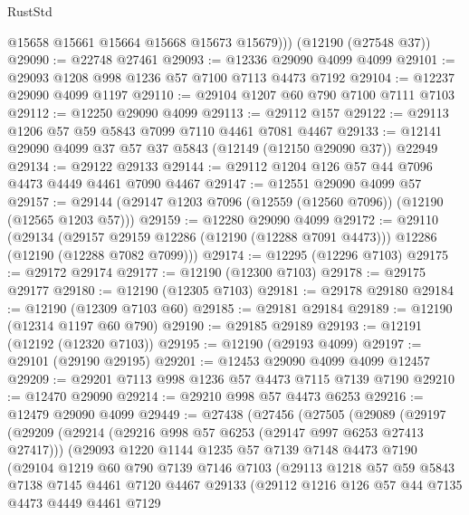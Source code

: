 \begin{lexlean}{RustStd}
\begin{coremodule}
          @15658
          @15661
          @15664
          @15668
          @15673
          @15679)))
    (@12190 (@27548 @37))
@29090 := @22748 @27461
@29093 := @12336 @29090 @4099 @4099
@29101 := @29093 @1208 @998 @1236 @57 @7100 @7113 @4473 @7192
@29104 := @12237 @29090 @4099 @1197
@29110 := @29104 @1207 @60 @790 @7100 @7111 @7103
@29112 := @12250 @29090 @4099
@29113 := @29112 @157
@29122 := @29113 @1206 @57 @59 @5843 @7099 @7110 @4461 @7081 @4467
@29133 := @12141 @29090 @4099 @37 @57 @37 @5843 (@12149 (@12150 @29090 @37)) @22949
@29134 := @29122 @29133
@29144 := @29112 @1204 @126 @57 @44 @7096 @4473 @4449 @4461 @7090 @4467
@29147 := @12551 @29090 @4099 @57
@29157 := @29144 (@29147 @1203 @7096 (@12559 (@12560 @7096)) (@12190 (@12565 @1203 @57)))
@29159 := @12280 @29090 @4099
@29172 := @29110
    (@29134
      (@29157 @29159 @12286 (@12190 (@12288 @7091 @4473)))
      @12286
      (@12190 (@12288 @7082 @7099)))
@29174 := @12295 (@12296 @7103)
@29175 := @29172 @29174
@29177 := @12190 (@12300 @7103)
@29178 := @29175 @29177
@29180 := @12190 (@12305 @7103)
@29181 := @29178 @29180
@29184 := @12190 (@12309 @7103 @60)
@29185 := @29181 @29184
@29189 := @12190 (@12314 @1197 @60 @790)
@29190 := @29185 @29189
@29193 := @12191 (@12192 (@12320 @7103))
@29195 := @12190 (@29193 @4099)
@29197 := @29101 (@29190 @29195)
@29201 := @12453 @29090 @4099 @4099 @12457
@29209 := @29201 @7113 @998 @1236 @57 @4473 @7115 @7139 @7190
@29210 := @12470 @29090
@29214 := @29210 @998 @57 @4473 @6253
@29216 := @12479 @29090 @4099
@29449 := @27438
    (@27456
      (@27505
        (@29089
          (@29197
            (@29209
              (@29214 (@29216 @998 @57 @6253 (@29147 @997 @6253 @27413 @27417)))
              (@29093
                @1220
                @1144
                @1235
                @57
                @7139
                @7148
                @4473
                @7190
                (@29104
                  @1219
                  @60
                  @790
                  @7139
                  @7146
                  @7103
                  (@29113
                    @1218
                    @57
                    @59
                    @5843
                    @7138
                    @7145
                    @4461
                    @7120
                    @4467
                    @29133
                    (@29112
                      @1216
                      @126
                      @57
                      @44
                      @7135
                      @4473
                      @4449
                      @4461
                      @7129

\end{coremodule}
\end{lexlean}

